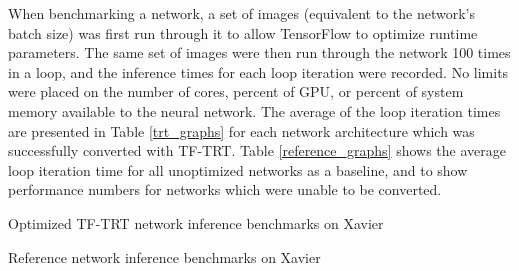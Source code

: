 When benchmarking a network, a set of images (equivalent to the network's batch size) was first run through it to allow TensorFlow to optimize runtime parameters. The same set of images were then run through the network 100 times in a loop, and the inference times for each loop iteration were recorded. No limits were placed on the number of cores, percent of GPU, or percent of system memory available to the neural network. The average of the loop iteration times are presented in Table \ref{trt_graphs} for each network architecture which was successfully converted with TF-TRT. Table \ref{reference_graphs} shows the average loop iteration time for all unoptimized networks as a baseline, and to show performance numbers for networks which were unable to be converted.


\begin{table}
	\centering
	\begin{adjustbox}{max width=.9\textwidth}
	\end{adjustbox}
	\caption{Optimized TF-TRT network inference benchmarks on Xavier}
	\label{trt_graphs}
\end{table}

\begin{table}
	\centering
	\begin{adjustbox}{max width=.9\textwidth}
	\end{adjustbox}
	\caption{Reference network inference benchmarks on Xavier}
	\label{reference_graphs}
\end{table}

